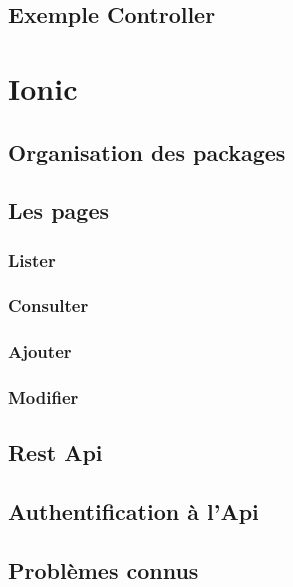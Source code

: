		\subsection{Exemple Controller}


	\section{Ionic}

		\subsection{Organisation des packages}


		\subsection{Les pages}


			\subsubsection{Lister}


			\subsubsection{Consulter}


			\subsubsection{Ajouter}


			\subsubsection{Modifier}


		\subsection{Rest Api}


		\subsection{Authentification à l'Api}


		\subsection{Problèmes connus}

